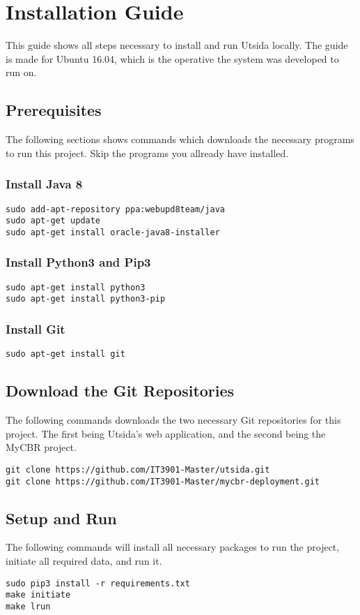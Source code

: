 \chapter{Installation Guide}\label{app:installation_guide}
This guide shows all steps necessary to install and run Utsida locally. The guide is made for Ubuntu 16.04, which is the operative the system was developed to run on.

\section{Prerequisites}
The following sections shows commands which downloads the necessary programs to run this project. Skip the programs you allready have installed.

\subsection{Install Java 8}
\begin{verbatim}
sudo add-apt-repository ppa:webupd8team/java
sudo apt-get update
sudo apt-get install oracle-java8-installer
\end{verbatim}

\subsection{Install Python3 and Pip3}
\begin{verbatim}
sudo apt-get install python3                                       
sudo apt-get install python3-pip   
\end{verbatim}

\subsection{Install Git}
\begin{verbatim}
sudo apt-get install git   
\end{verbatim}

\section{Download the Git Repositories}
The following commands downloads the two necessary Git repositories for this project. The first being Utsida's web application, and the second being the MyCBR project.

\begin{verbatim}
git clone https://github.com/IT3901-Master/utsida.git              
git clone https://github.com/IT3901-Master/mycbr-deployment.git    
\end{verbatim}


\section{Setup and Run}
The following commands will install all necessary packages to run the project, initiate all required data, and run it.

\begin{verbatim}
sudo pip3 install -r requirements.txt
make initiate
make lrun 
\end{verbatim}

